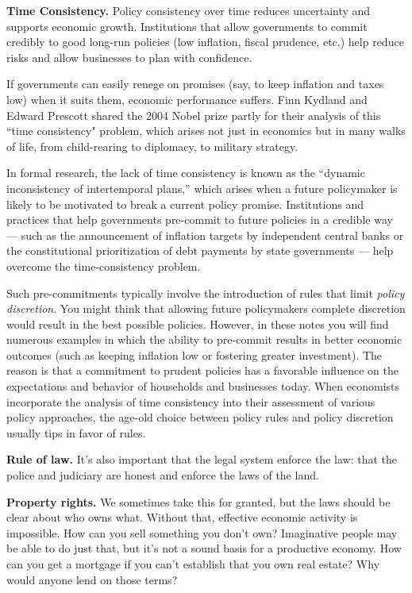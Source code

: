 \textbf{Time Consistency.}
\label{sec:time_cons}Policy consistency over time reduces uncertainty and supports economic
growth. Institutions that allow governments to commit credibly to
good long-run policies (low inflation, fiscal prudence, etc.) help
reduce risks and allow businesses to plan with confidence.

If governments can easily renege on promises (say, to keep
inflation and taxes low) when it suits them,
economic performance suffers. Finn Kydland and Edward Prescott
shared the 2004 Nobel prize partly for their analysis of this ``time
consistency" problem, which arises not just in economics
but in many walks of life, from child-rearing to diplomacy,
to military strategy.

In formal research, the lack of time consistency is known as the
``dynamic inconsistency of intertemporal plans,'' which arises when a
future policymaker is likely to be motivated to break a current policy
promise. Institutions and practices that help governments pre-commit
to future policies in a credible way --- such as the announcement of inflation targets
by independent central banks or the constitutional prioritization
of debt payments by state governments --- help overcome
the time-consistency problem.

Such pre-commitments typically involve the introduction of
rules that limit \emph{policy discretion}. You might think that allowing
future policymakers complete discretion would result in the best possible
policies. However, in these notes you will find numerous examples in which the
ability to pre-commit results in better economic outcomes
(such as keeping inflation low or fostering greater investment).
The reason is that a commitment to prudent policies has a favorable influence
on the expectations and behavior of households and businesses today. When
economists incorporate the analysis of time consistency into
their assessment of various policy approaches, the age-old choice between
policy rules and policy discretion usually tips in favor of rules.

\textbf{Rule of law.}
It's also important that the legal system enforce the law:
that the police and judiciary are honest and
enforce the laws of the land.

\textbf{Property rights.}
We sometimes take this for granted,
but the laws should be clear about who owns what.
Without that, effective economic activity is impossible.
How can you sell something you don't own?
Imaginative people may be able to do just that,
but it's not a sound basis for a productive economy.
How can you get a mortgage if you can't establish
that you own real estate?
Why would anyone lend on those terms?

